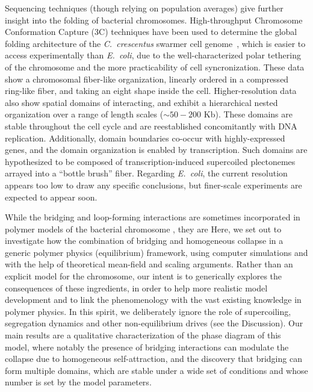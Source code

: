 \documentclass[a4paper,12pt,pre,superscriptaddress]{revtex4}
\begin{document}
Sequencing techniques (though relying on population averages) give
further insight into the folding of bacterial chromosomes.
High-throughput Chromosome Conformation Capture (3C) techniques have
been used to determine the global folding architecture of the
\emph{C.~crescentus} swarmer cell genome~\cite{Le2013,Umbarger2011},
which is easier to access experimentally than \emph{E.~coli}, due to
the well-characterized polar tethering of the chromosome and 
%
the more practicability of cell syncronization.
%
These data show a chromosomal fiber-like organization, linearly
ordered in a compressed ring-like fiber, and taking an eight shape
inside the cell.
%
Higher-resolution data~\cite{Le2013} also show spatial domains of
interacting, and exhibit a hierarchical nested organization over a
range of length scales ($\sim50-200$ Kb). These domains are stable
throughout the cell cycle and are reestablished concomitantly with DNA
replication.  Additionally, domain boundaries co-occur with
highly-expressed genes, and the domain organization is enabled by
transcription. Such domains are hypothesized to be composed of
transcription-induced supercoiled plectonemes arrayed into a ``bottle
brush'' fiber.
Regarding \emph{E.~coli}, the current resolution appears too low
\cite{Cagliero2013} to draw any specific conclusions, but finer-scale
experiments are expected to appear soon.



While the bridging and loop-forming interactions are sometimes
incorporated in polymer models of the bacterial chromosome
\cite{Junier2013,Fritsche2012,Heermann2012}, they are 
Here, we set out to investigate how the combination of bridging and
homogeneous collapse in a generic polymer physics (equilibrium)
framework, using computer simulations and with the help of theoretical
mean-field and scaling arguments.
Rather than an explicit model for the chromosome, our intent is to
generically explores the consequences of these ingredients, in order
to help more realistic model development and to link the phenomenology
with the vast existing knowledge in polymer physics.
In this spirit, we deliberately ignore the role of supercoiling,
segregation dynamics and other non-equilibrium drives (see the
Discussion).
Our main results are a qualitative characterization of the phase
diagram of this model, where notably the presence of bridging
interactions can modulate the collapse due to homogeneous
self-attraction, and the discovery that bridging can form multiple
domains, which are stable under a wide set of conditions and whose
number is set by the model parameters.
\end{document}
